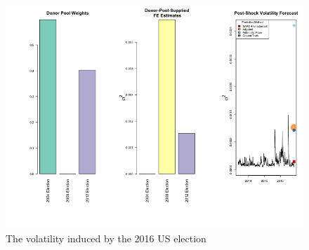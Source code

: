 \documentclass[11pt]{article}
\theoremstyle{definition}
\begin{document}
\begin{figure}[H]
\begin{center}
  \includegraphics[scale=.5]{real_data_output_plots/savetime_SunMar172252462024_IYG_CL=F-^VIX-^IRX-^FVX-^TNX-^TYX_^VIX_2016-11-08-2004-11-02-2008-11-04-2012-11-06.png}
  \caption{The volatility induced by the 2016 US election}
  \label{fig:SVF_2016}
  \end{center}
\end{figure}
\end{document}
